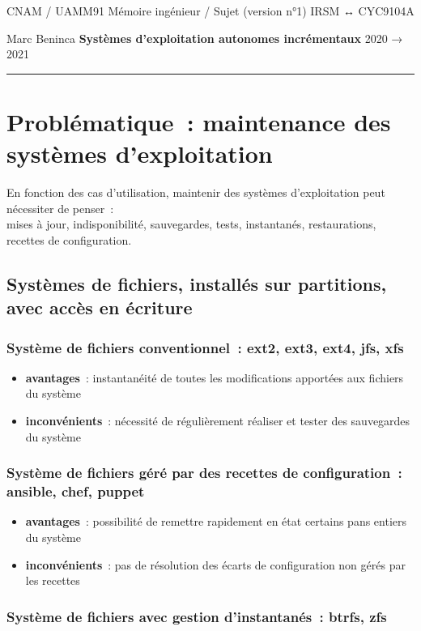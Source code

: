 \documentclass[10pt]{article}
\newcommand{\hr}{\rule{\textwidth}{1pt}}
\newenvironment{itmz}{\begin{itemize}
\setlength{\itemsep}{0em}
}{\end{itemize}}
\begin{document}
CNAM / UAMM91 \hfill Mémoire ingénieur / Sujet (version n°1) \hfill IRSM ↔ CYC9104A

Marc Beninca \hfill \textbf{Systèmes d’exploitation autonomes incrémentaux} \hfill 2020 → 2021

\hr

\section{Problématique : maintenance des systèmes d’exploitation}

En fonction des cas d’utilisation, maintenir des systèmes d’exploitation peut nécessiter de penser :\\
mises à jour, indisponibilité, sauvegardes, tests, instantanés, restaurations, recettes de configuration.

\subsection{Systèmes de fichiers, installés sur partitions, avec accès en écriture}

\subsubsection{Système de fichiers conventionnel : ext2, ext3, ext4, jfs, xfs}

\begin{itmz}
\item{\textbf{avantages} : instantanéité de toutes les modifications apportées aux fichiers du système}
\item{\textbf{inconvénients} : nécessité de régulièrement réaliser et tester des sauvegardes du système}
\end{itmz}

\subsubsection{Système de fichiers géré par des recettes de configuration : ansible, chef, puppet}

\begin{itmz}
\item{\textbf{avantages} : possibilité de remettre rapidement en état certains pans entiers du système}
\item{\textbf{inconvénients} : pas de résolution des écarts de configuration non gérés par les recettes}
\end{itmz}

\subsubsection{Système de fichiers avec gestion d’instantanés : btrfs, zfs}
\end{document}
